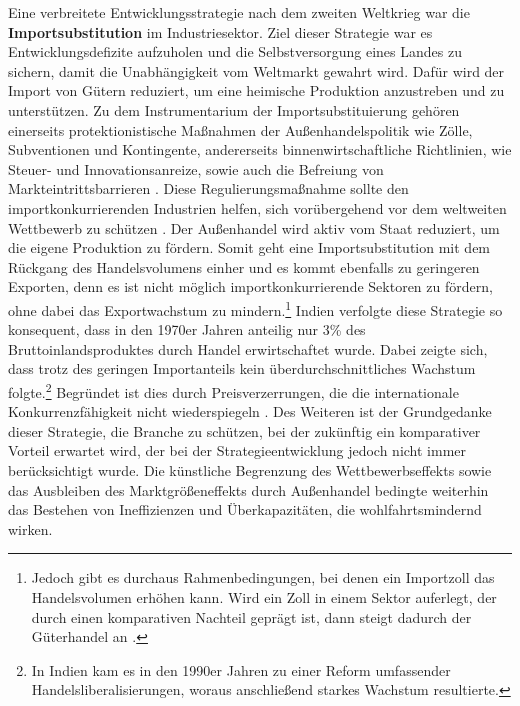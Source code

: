 Eine verbreitete Entwicklungsstrategie nach dem zweiten Weltkrieg war die \textbf{Importsubstitution} im Industriesektor. Ziel dieser Strategie war es Entwicklungsdefizite aufzuholen und die Selbstversorgung eines Landes zu sichern, damit die Unabh{\"a}ngigkeit vom Weltmarkt gewahrt wird. Daf{\"u}r wird der Import von G{\"u}tern reduziert, um eine heimische Produktion anzustreben und zu unterst{\"u}tzen. Zu dem Instrumentarium der Importsubstituierung geh{\"o}ren einerseits protektionistische Ma{\ss}nahmen der Au{\ss}enhandelspolitik wie Z{\"o}lle, Subventionen und Kontingente, andererseits binnenwirtschaftliche Richtlinien, wie Steuer- und Innovationsanreize, sowie auch die Befreiung von Markteintrittsbarrieren \citep{Muller.2005,Lachmann.1994}. Diese Regulierungsma{\ss}nahme sollte den importkonkurrierenden Industrien helfen, sich vor{\"u}bergehend vor dem weltweiten Wettbewerb zu sch{\"u}tzen \cite{Lewis.1955}. Der Au{\ss}enhandel wird aktiv vom Staat reduziert, um die eigene Produktion zu f{\"o}rdern. Somit geht eine Importsubstitution mit dem R{\"u}ckgang des Handelsvolumens einher und es kommt ebenfalls zu geringeren Exporten, denn es ist nicht m{\"o}glich importkonkurrierende Sektoren zu f{\"o}rdern, ohne dabei das Exportwachstum zu mindern.\footnote{Jedoch gibt es durchaus Rahmenbedingungen, bei denen ein Importzoll das Handelsvolumen erh{\"o}hen kann. Wird ein Zoll in einem Sektor auferlegt, der durch einen komparativen Nachteil gepr{\"a}gt ist, dann steigt dadurch der G{\"u}terhandel an \cite{Lancaster.1980}.} 
Indien verfolgte diese Strategie so konsequent, dass in den 1970er Jahren anteilig nur 3{\%} des Bruttoinlandsproduktes durch Handel erwirtschaftet wurde. Dabei zeigte sich, dass trotz des geringen Importanteils kein {\"u}berdurchschnittliches Wachstum folgte.\footnote{In Indien kam es in den 1990er Jahren zu einer Reform umfassender Handelsliberalisierungen, woraus anschlie{\ss}end starkes Wachstum resultierte.}
Begr{\"u}ndet ist dies durch Preisverzerrungen, die die internationale Konkurrenzf{\"a}higkeit nicht wiederspiegeln \citep{Lachmann.1994}. Des Weiteren ist der Grundgedanke dieser Strategie, die Branche zu sch{\"u}tzen, bei der zuk{\"u}nftig ein komparativer Vorteil erwartet wird, der bei der Strategieentwicklung jedoch nicht immer ber{\"u}cksichtigt wurde. Die k{\"u}nstliche Begrenzung des Wettbewerbseffekts sowie das Ausbleiben des Marktgr{\"o}{\ss}eneffekts durch Au{\ss}enhandel bedingte weiterhin das Bestehen von Ineffizienzen und {\"U}berkapazit{\"a}ten, die wohlfahrtsmindernd wirken. \\


